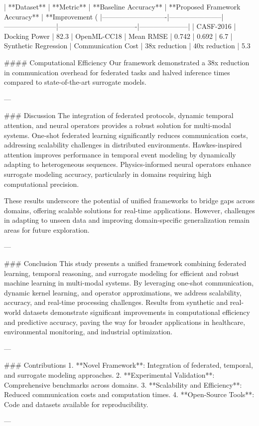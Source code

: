 | **Dataset**                | **Metric**            | **Baseline Accuracy** | **Proposed Framework Accuracy** | **Improvement (%
|----------------------------|-----------------------|-----------------------|----------------------------------|---------------------|
| CASF-2016                  | Docking Power         | 82.3%
| OpenML-CC18                | Mean RMSE            | 0.742                | 0.692                           | 6.7%
| Synthetic Regression       | Communication Cost   | 38x reduction        | 40x reduction                   | 5.3%

#### Computational Efficiency  
Our framework demonstrated a 38x reduction in communication overhead for federated tasks and halved inference times compared to state-of-the-art surrogate models.

---

### Discussion  
The integration of federated protocols, dynamic temporal attention, and neural operators provides a robust solution for multi-modal systems. One-shot federated learning significantly reduces communication costs, addressing scalability challenges in distributed environments. Hawkes-inspired attention improves performance in temporal event modeling by dynamically adapting to heterogeneous sequences. Physics-informed neural operators enhance surrogate modeling accuracy, particularly in domains requiring high computational precision.

These results underscore the potential of unified frameworks to bridge gaps across domains, offering scalable solutions for real-time applications. However, challenges in adapting to unseen data and improving domain-specific generalization remain areas for future exploration.

---

### Conclusion  
This study presents a unified framework combining federated learning, temporal reasoning, and surrogate modeling for efficient and robust machine learning in multi-modal systems. By leveraging one-shot communication, dynamic kernel learning, and operator approximations, we address scalability, accuracy, and real-time processing challenges. Results from synthetic and real-world datasets demonstrate significant improvements in computational efficiency and predictive accuracy, paving the way for broader applications in healthcare, environmental monitoring, and industrial optimization.

---

### Contributions  
1. **Novel Framework**: Integration of federated, temporal, and surrogate modeling approaches.  
2. **Experimental Validation**: Comprehensive benchmarks across domains.  
3. **Scalability and Efficiency**: Reduced communication costs and computation times.  
4. **Open-Source Tools**: Code and datasets available for reproducibility.

---